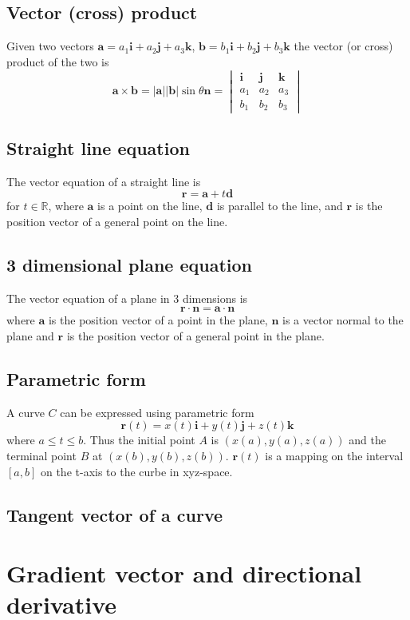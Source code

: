 \documentclass[12pt]{article}
\begin{document}
	\subsection{Vector (cross) product}
	\begin{defn}
		Given two vectors $\mathbf{a} = a_1 \mathbf{i} + a_2 \mathbf{j} + a_3 \mathbf{k}$,
		$\mathbf{b} = b_1 \mathbf{i} + b_2 \mathbf{j} + b_3 \mathbf{k}$ the vector (or cross) product of the two is
		\[
			\mathbf{a} \times \mathbf{b} = |\mathbf{a}||\mathbf{b}|\sin{\theta}\mathbf{n} =
			\begin{vmatrix}
				\mathbf{i} & \mathbf{j} & \mathbf{k} \\
				a_1 & a_2 & a_3 \\
				b_1 & b_2 & b_3 
			\end{vmatrix} 
		\]
	\end{defn}
	
	\subsection{Straight line equation}
	\begin{defn}
		The vector equation of a straight line is
		\[
			\mathbf{r} = \mathbf{a} + t \mathbf{d}
		\]
		for $t \in \mathbb{R}$, where $\mathbf{a}$ is a point on the line, $\mathbf{d}$ is parallel to the line, 
		and $\mathbf{r}$ is the position vector of a general point on the line.
	\end{defn}
	
	\subsection{3 dimensional plane equation}
	\begin{defn}
		The vector equation of a plane in 3 dimensions is
		\[
			\mathbf{r} \cdot \mathbf{n} = \mathbf{a} \cdot \mathbf{n}
		\]
		where $\mathbf{a}$ is the position vector of a point in the plane, $\mathbf{n}$ is a vector normal to
		the plane and $\mathbf{r}$ is the position vector of a general point in the plane.
	\end{defn}
	
	\subsection{Parametric form}
	A curve $C$ can be expressed using parametric form
	\[
		\mathbf{r}(t) = x(t)\mathbf{i} + y(t)\mathbf{j} + z(t)\mathbf{k}
	\]
	where $a \leq t \leq b$. Thus the initial point $A$ is $(x(a),y(a),z(a))$ and the terminal point $B$ at $(x(b),y(b),z(b))$.
	$\mathbf{r}(t)$ is a mapping on the interval $[a,b]$ on the t-axis to the curbe in xyz-space.
	
	\subsection{Tangent vector of a curve}

\section{Gradient vector and directional derivative}
\end{document}

